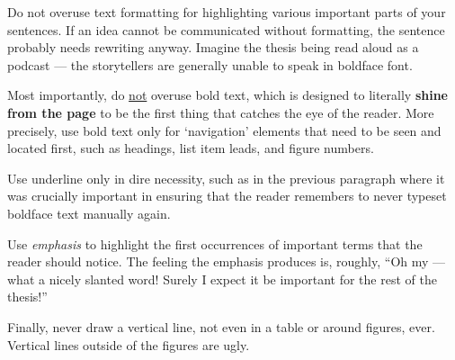 Do not overuse text formatting for highlighting various important parts of your sentences. If an idea cannot be communicated without formatting, the sentence probably needs rewriting anyway. Imagine the thesis being read aloud as a podcast --- the storytellers are generally unable to speak in boldface font.

Most importantly, do \underline{not} overuse bold text, which is designed to literally \textbf{shine from the page} to be the first thing that catches the eye of the reader. More precisely, use bold text only for `navigation' elements that need to be seen and located first, such as headings, list item leads, and figure numbers.

Use underline only in dire necessity, such as in the previous paragraph where it was crucially important in ensuring that the reader remembers to never typeset boldface text manually again.

Use \emph{emphasis} to highlight the first occurrences of important terms that the reader should notice. The feeling the emphasis produces is, roughly, ``Oh my --- what a nicely slanted word! Surely I expect it be important for the rest of the thesis!''

Finally, never draw a vertical line, not even in a table or around figures, ever. Vertical lines outside of the figures are ugly.
